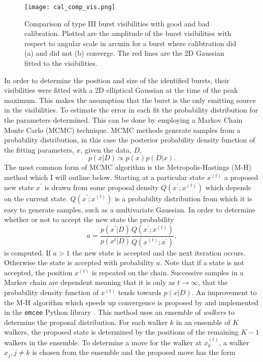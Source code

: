 \begin{figure}
\centering
\texttt{[image: cal\_comp\_vis.png]}
\caption[Comparison of type III burst visibilities with good and bad calibration.]{Comparison of type III burst visibilities with good and bad calibration. Plotted are the amplitude of the burst visibilities with respect to angular scale in arcmin for a burst where calibtration did (a) and did not (b) converge. The red lines are the 2D Gaussian fitted to the visibilities.}
\label{fig:cal_comp}
\end{figure}

In order to determine the position and size of the identified bursts, their visibilities were fitted with a 2D elliptical Gaussian at the time of the peak maximum. This makes the assumption that the burst is the only emitting source in the visibilities.
To estimate the error in each fit the probability distribution for the parameters determined. This can be done by employing a Markov Chain Monte Carlo (MCMC) technique. MCMC methods generate samples from a probability distribution, in this case the posterior probability density function of the fitting parameters, $x$, given the data, $D$,
\begin{equation}
\label{eq:pdf}
p(x \vert D) \propto p(x)p(D \vert x).
\end{equation}	
The most common form of MCMC algorithm is the Metropolis-Hastings (M-H) method which I will outline below. Starting at a particular state $x^{(t)}$ a proposed new state $x^\prime$ is drawn from some proposal density $Q(x^\prime;x^{(t)})$ which depends on the current state. $Q(x^\prime;x^{(t)})$ is a probability distribution from which it is easy to generate samples, such as a multivariate Gaussian. In order to determine whether or not to accept the new state the probability
\begin{equation}
\label{eq:MHnewstate}
a = \frac{p(x^\prime \vert D)}{p(x^{t} \vert D)} \frac{Q(x^\prime;x^{(t)})}{Q(x^{(t)};x^\prime)},
\end{equation}
is computed. If $a > 1$ the new state is accepted and the next iteration occurs. Otherwise the state is accepted with probability $a$. Note that if a state is not accepted, the position $x^{(t)}$ is repeated on the chain. Successive samples in a Markov chain are dependent meaning that it is only as $t \rightarrow \infty$, that the probability density function of $x^{(t)}$ tends towards $p(x \vert D)$. An improvement to the M-H algorithm which speeds up convergence is proposed by \cite{Goodman2010} and implemented in the \texttt{emcee} Python library \citep{Foreman-Mackey2012}. This method uses an ensemble of \textit{walkers} to determine the proposal distribution. For each walker $k$ in an ensemble of $K$ walkers, the proposed state is determined by the positions of the remaining $K-1$ walkers in the ensemble. To determine a move for the walker at $x_k^{(t)}$, a walker $x_j, j \neq k$ is chosen from the ensemble and the proposed move has the form
